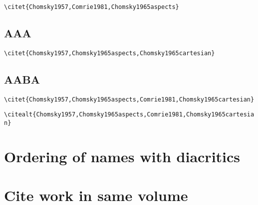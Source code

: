         \citet{Chomsky1957}            


\bigskip
\verb+\citet{Chomsky1957,Comrie1981,Chomsky1965aspects}+

       \citet{Chomsky1957,Comrie1981,Chomsky1965aspects} 

 
 
\subsection{AAA} 

\bigskip
\verb+\citet{Chomsky1957,Chomsky1965aspects,Chomsky1965cartesian}+

       \citet{Chomsky1957,Chomsky1965aspects,Chomsky1965cartesian} 
 
\subsection{AABA} 
\bigskip
\verb+\citet{Chomsky1957,Chomsky1965aspects,Comrie1981,Chomsky1965cartesian}+

       \citet{Chomsky1957,Chomsky1965aspects,Comrie1981,Chomsky1965cartesian} 
\bigskip
\verb+\citealt{Chomsky1957,Chomsky1965aspects,Comrie1981,Chomsky1965cartesian}+

       \citealt{Chomsky1957,Chomsky1965aspects,Comrie1981,Chomsky1965cartesian} 

 
\section{Ordering of names with diacritics} 
\citet{Circov1900,MeierCircovac1900}

\section{Cite work in same volume}


